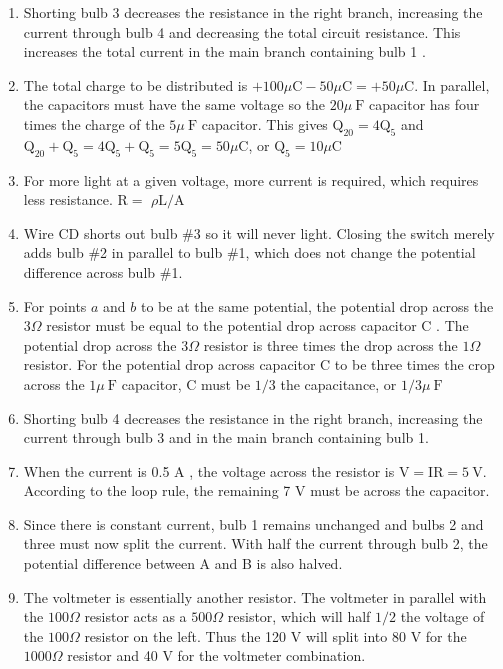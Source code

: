 \begin{enumerate}
\begin{enumerate}
  \item Shorting bulb 3 decreases the resistance in the right branch, increasing the current through bulb 4 and decreasing the total circuit resistance. This increases the total current in the main branch containing bulb 1 .
  \item The total charge to be distributed is $+100 \mu \mathrm{C}-50 \mu \mathrm{C}=+50 \mu \mathrm{C}$. In parallel, the capacitors must have the same voltage so the $20 \mu \mathrm{~F}$ capacitor has four times the charge of the $5 \mu \mathrm{~F}$ capacitor. This gives $\mathrm{Q}_{20}=4 \mathrm{Q}_{5}$ and $\mathrm{Q}_{20}+\mathrm{Q}_{5}=4 \mathrm{Q}_{5}+\mathrm{Q}_{5}=5 \mathrm{Q}_{5}=50 \mu \mathrm{C}$, or $\mathrm{Q}_{5}=10 \mu \mathrm{C}$
  \item For more light at a given voltage, more current is required, which requires less resistance. $\mathrm{R}=$ $\rho \mathrm{L} / \mathrm{A}$
  \item Wire CD shorts out bulb \#3 so it will never light. Closing the switch merely adds bulb \#2 in parallel to bulb \#1, which does not change the potential difference across bulb \#1.
  \item For points $a$ and $b$ to be at the same potential, the potential drop across the $3 \Omega$ resistor must be equal to the potential drop across capacitor C . The potential drop across the $3 \Omega$ resistor is three times the drop across the $1 \Omega$ resistor. For the potential drop across capacitor C to be three times the crop across the $1 \mu \mathrm{~F}$ capacitor, C must be $1 / 3$ the capacitance, or $1 / 3 \mu \mathrm{~F}$
  \item Shorting bulb 4 decreases the resistance in the right branch, increasing the current through bulb 3 and in the main branch containing bulb 1.
  \item When the current is 0.5 A , the voltage across the resistor is $\mathrm{V}=\mathrm{IR}=5 \mathrm{~V}$. According to the loop rule, the remaining 7 V must be across the capacitor.
  \item Since there is constant current, bulb 1 remains unchanged and bulbs 2 and three must now split the current. With half the current through bulb 2, the potential difference between A and B is also halved.
  \item The voltmeter is essentially another resistor. The voltmeter in parallel with the $100 \Omega$ resistor acts as a $500 \Omega$ resistor, which will half $1 / 2$ the voltage of the $100 \Omega$ resistor on the left. Thus the 120 V will split into 80 V for the $1000 \Omega$ resistor and 40 V for the voltmeter combination.

\end{enumerate}
\end{enumerate}
